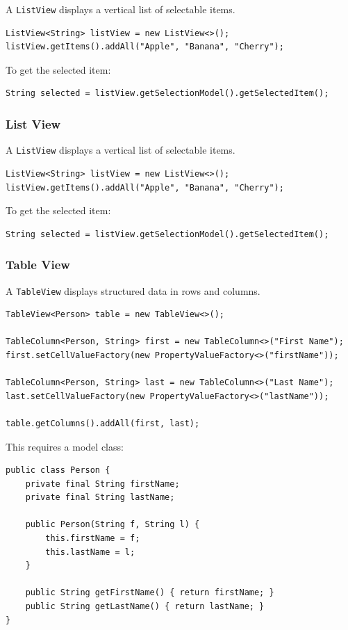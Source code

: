 \documentclass{article}
\newcommand{\codecmd}[1]{\textcolor[rgb]{0,0.5,0}{\texttt{#1}}}
\begin{document}
A \codecmd{ListView} displays a vertical list of selectable items.

\begin{verbatim}
ListView<String> listView = new ListView<>();
listView.getItems().addAll("Apple", "Banana", "Cherry");
\end{verbatim}

\noindent To get the selected item:
\begin{verbatim}
String selected = listView.getSelectionModel().getSelectedItem();
\end{verbatim}

\subsubsection{List View}

A \codecmd{ListView} displays a vertical list of selectable items.

\begin{verbatim}
ListView<String> listView = new ListView<>();
listView.getItems().addAll("Apple", "Banana", "Cherry");
\end{verbatim}

\noindent To get the selected item:
\begin{verbatim}
String selected = listView.getSelectionModel().getSelectedItem();
\end{verbatim}

\subsubsection{Table View}

A \codecmd{TableView} displays structured data in rows and columns.

\begin{verbatim}
TableView<Person> table = new TableView<>();

TableColumn<Person, String> first = new TableColumn<>("First Name");
first.setCellValueFactory(new PropertyValueFactory<>("firstName"));

TableColumn<Person, String> last = new TableColumn<>("Last Name");
last.setCellValueFactory(new PropertyValueFactory<>("lastName"));

table.getColumns().addAll(first, last);
\end{verbatim}

\noindent This requires a model class:
\begin{verbatim}
public class Person {
    private final String firstName;
    private final String lastName;

    public Person(String f, String l) {
        this.firstName = f;
        this.lastName = l;
    }

    public String getFirstName() { return firstName; }
    public String getLastName() { return lastName; }
}
\end{verbatim}
\end{document}

